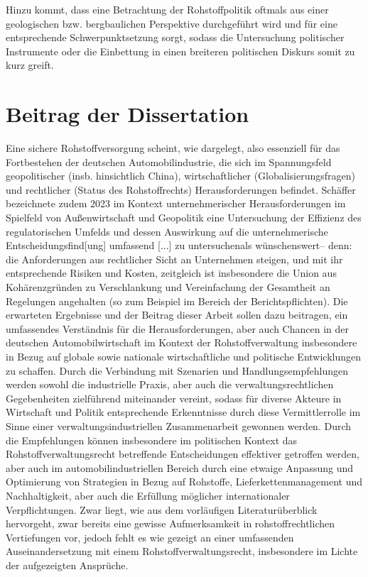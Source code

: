 \documentclass[12pt,a4paper,oneside]{book} %
\begin{document}
Hinzu kommt, dass eine Betrachtung der Rohstoffpolitik oftmals aus einer geologischen bzw. bergbaulichen Perspektive durchgeführt wird und für eine entsprechende Schwerpunktsetzung sorgt, sodass die Untersuchung politischer Instrumente oder die Einbettung in einen breiteren politischen Diskurs somit zu kurz greift.\autocite{Drawing lessons from mineral and land use policy in Europe: Crossing policy streams or getting stuck in silos?}




\section{Beitrag der Dissertation}
Eine sichere Rohstoffversorgung scheint, wie dargelegt, also essenziell für das Fortbestehen der deutschen Automobilindustrie, die sich im Spannungsfeld geopolitischer (insb. hinsichtlich China), wirtschaftlicher (Globalisierungsfragen) und rechtlicher (Status des Rohstoffrechts) Herausforderungen befindet. Schäffer bezeichnete zudem 2023\autocite{Schäffer, EuZW 2023, 695} im Kontext unternehmerischer Herausforderungen im Spielfeld von Außenwirtschaft und Geopolitik eine Untersuchung der \glqq Effizienz des regulatorischen Umfelds und dessen Auswirkung auf die unternehmerische Entscheidungsfind[ung] umfassend [...] zu untersuchen\grqq als \glqq wünschenswert\grqq -- denn: die Anforderungen aus rechtlicher Sicht an Unternehmen steigen, und mit ihr entsprechende Risiken und Kosten, zeitgleich ist insbesondere die Union aus Kohärenzgründen zu Verschlankung und Vereinfachung der Gesamtheit an Regelungen angehalten (so zum Beispiel im Bereich der Berichtspflichten).\autocite{Schäffer, EuZW 2023, 695}
Die erwarteten Ergebnisse und der Beitrag dieser Arbeit sollen dazu beitragen, ein umfassendes Verständnis für die Herausforderungen, aber auch Chancen in der deutschen Automobilwirtschaft im Kontext der Rohstoffverwaltung insbesondere in Bezug auf globale sowie nationale wirtschaftliche und politische Entwicklungen zu schaffen. Durch die Verbindung mit Szenarien und Handlungsempfehlungen werden sowohl die industrielle Praxis, aber auch die verwaltungsrechtlichen Gegebenheiten zielführend miteinander vereint, sodass für diverse Akteure in Wirtschaft und Politik entsprechende Erkenntnisse durch diese Vermittlerrolle im Sinne einer verwaltungsindustriellen Zusammenarbeit gewonnen werden. Durch die Empfehlungen können insbesondere im politischen Kontext das Rohstoffverwaltungsrecht betreffende Entscheidungen effektiver getroffen werden, aber auch im automobilindustriellen Bereich durch eine etwaige Anpassung und Optimierung von Strategien in Bezug auf Rohstoffe, Lieferkettenmanagement und Nachhaltigkeit, aber auch die Erfüllung möglicher internationaler Verpflichtungen. Zwar liegt, wie aus dem vorläufigen Literaturüberblick hervorgeht, zwar bereits eine gewisse Aufmerksamkeit in rohstoffrechtlichen Vertiefungen vor, jedoch fehlt es wie gezeigt an einer umfassenden Auseinandersetzung mit einem Rohstoffverwaltungsrecht, insbesondere im Lichte der aufgezeigten Ansprüche.
\end{document}
